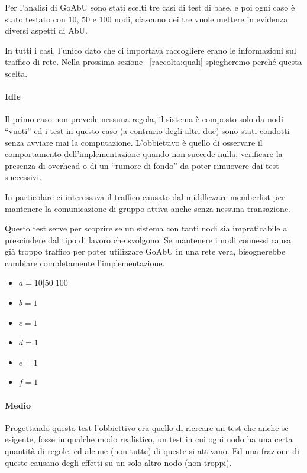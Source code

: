 \documentclass[target=bach]{thud}
\begin{document}
Per l'analisi di GoAbU sono stati scelti tre casi di test di base, e poi ogni caso è stato testato con $10$, $50$ e $100$ nodi, ciascuno dei tre vuole mettere in evidenza diversi aspetti di AbU.

In tutti i casi, l'unico dato che ci importava raccogliere erano le informazioni sul traffico di rete. Nella prossima sezione ~\ref{raccolta:quali} spiegheremo perché questa scelta.

\paragraph{Idle}

Il primo caso non prevede nessuna regola, il sistema è composto solo da nodi ``vuoti'' ed i test in questo caso (a contrario degli altri due) sono stati condotti senza avviare mai la computazione.
L'obbiettivo è quello di osservare il comportamento dell'implementazione quando non succede nulla, verificare la presenza di overhead o di un ``rumore di fondo'' da poter rimuovere dai test successivi.

In particolare ci interessava il traffico causato dal middleware memberlist per mantenere la comunicazione di gruppo attiva anche senza nessuna transazione.

Questo test serve per scoprire se un sistema con tanti nodi sia impraticabile a prescindere dal tipo di lavoro che svolgono. Se mantenere i nodi connessi causa già troppo traffico per poter utilizzare GoAbU in una rete vera, bisognerebbe cambiare completamente l'implementazione.

\begin{itemize}
    \item $a=10|50|100$
    \item $b=1$
    \item $c=1$
    \item $d=1$
    \item $e=1$
    \item $f=1$
\end{itemize}

\paragraph{Medio}

Progettando questo test l'obbiettivo era quello di ricreare un test che anche se esigente, fosse in qualche modo realistico, un test in cui ogni nodo ha una certa quantità di regole, ed alcune (non tutte) di queste si attivano. Ed una frazione di queste causano degli effetti su un solo altro nodo (non troppi).
\end{document}
